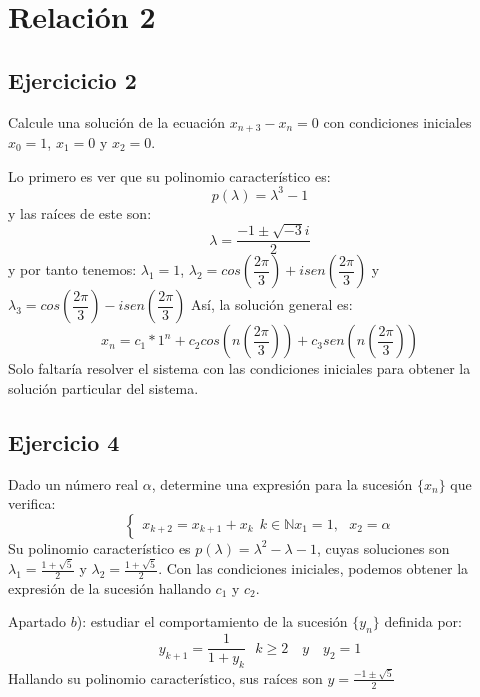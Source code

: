 \documentclass[11pt, a4paper, titlepage]{article}
\theoremstyle{theorem-style}
\theoremstyle{definition-style}
\theoremstyle{remark-style}
\theoremstyle{example-style}
\begin{document}
\section{Relación 2}

\subsection{Ejercicicio 2}
Calcule una solución de la ecuación $x_ {n+3} -x_n = 0$ con condiciones iniciales $x_0 = 1$, $x_1 = 0$ y $x_2 = 0$.

Lo primero es ver que su polinomio característico es:
\[
p(\lambda) = \lambda^3 -1
\]
y las raíces de este son:
\[
\lambda = \frac{-1 \pm \sqrt{-3}i}{2}
\]
y por tanto tenemos: $\lambda_1 = 1$, $\lambda_2 = cos(\dfrac{2\pi}{3})+ i sen(\dfrac{2\pi}{3})$ y $\lambda_3 = cos(\dfrac{2\pi}{3}) - i sen(\dfrac{2\pi}{3})$
Así, la solución general es:
\[
x_n = c_1 * 1^n + c_2 cos(n(\dfrac{2\pi}{3})) + c_3 sen(n(\dfrac{2\pi}{3}))
\]
Solo faltaría resolver el sistema con las condiciones iniciales para obtener la solución particular del sistema.


\subsection{Ejercicio 4}
Dado un número real $\alpha$, determine una expresión para la sucesión $\{x_n\}$ que verifica:
\[
\begin{cases}
	x_{k+2} = x _{k+1} + x_k \ \ k \in \mathbb N
	x_1 = 1, \ \ \ x_2 = \alpha
\end{cases}
\]
Su polinomio característico es $p(\lambda) = \lambda^2 - \lambda - 1$, cuyas soluciones son $\lambda_1 = \frac{1+\sqrt 5}{2}$ y $\lambda_2 = \frac{1+ \sqrt 5}{2}$. Con las condiciones iniciales, podemos obtener la expresión de la sucesión hallando $c_1$ y $c_2$.

Apartado $b$): estudiar el comportamiento de la sucesión $\{y_n\}$ definida por:
\[
y_{k+1} = \frac{1}{1+y_k} \ \ \ k \geq 2 \quad y \quad y_2 = 1
\]
Hallando su polinomio característico, sus raíces son $y = \frac{-1 \pm \sqrt 5}{2}$
\end{document}
